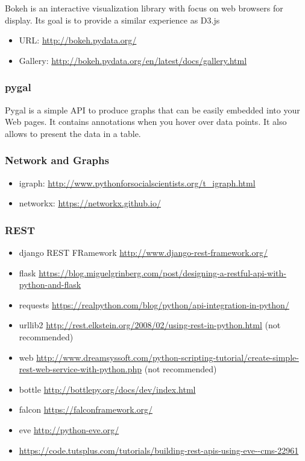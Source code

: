 Bokeh is an interactive visualization library with focus on web browsers
for display. Its goal is to provide a similar experience as D3.js

\begin{itemize}
\item
  URL: \url{http://bokeh.pydata.org/}
\item
  Gallery: \url{http://bokeh.pydata.org/en/latest/docs/gallery.html}
\end{itemize}

\subsubsection{pygal}\label{pygal}

Pygal is a simple API to produce graphs that can be easily embedded into
your Web pages. It contains annotations when you hover over data points.
It also allows to present the data in a table.



\subsubsection{Network and Graphs}\label{network-and-graphs}

\begin{itemize}

\item
  igraph: \url{http://www.pythonforsocialscientists.org/t_igraph.html}
\item
  networkx: \url{https://networkx.github.io/}
\end{itemize}

\subsubsection{REST}\label{rest}

\begin{itemize}

\item
  django REST FRamework \url{http://www.django-rest-framework.org/}
\item
  flask
  \url{https://blog.miguelgrinberg.com/post/designing-a-restful-api-with-python-and-flask}
\item
  requests
  \url{https://realpython.com/blog/python/api-integration-in-python/}
\item
  urllib2
  \url{http://rest.elkstein.org/2008/02/using-rest-in-python.html} (not
  recommended)
\item
  web
  \url{http://www.dreamsyssoft.com/python-scripting-tutorial/create-simple-rest-web-service-with-python.php}
  (not recommended)
\item
  bottle \url{http://bottlepy.org/docs/dev/index.html}
\item
  falcon \url{https://falconframework.org/}
\item
  eve \url{http://python-eve.org/}
\item
  \url{https://code.tutsplus.com/tutorials/building-rest-apis-using-eve--cms-22961}
\end{itemize}

